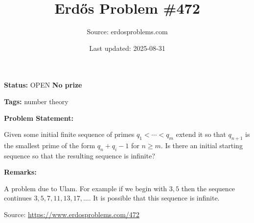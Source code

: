 \documentclass{article}
\title{Erd\H{o}s Problem \#472}
\date{Last updated: 2025-08-31}
\author{Source: erdosproblems.com}
\begin{document}
\maketitle

\noindent\textbf{Status:} OPEN \quad \textbf{No prize}

\noindent\textbf{Tags:} number theory

\medskip
\noindent\textbf{Problem Statement:}

Given some initial finite sequence of primes $q_1<\cdots<q_m$ extend it so that $q_{n+1}$ is the smallest prime of the form $q_n+q_i-1$ for $n\geq m$. Is there an initial starting sequence so that the resulting sequence is infinite?

\bigskip
\noindent\textbf{Remarks:}

A problem due to Ulam. For example if we begin with $3,5$ then the sequence continues $3,5,7,11,13,17,\ldots$. It is possible that this sequence is infinite.

\bigskip
\noindent\small{Source: \url{https://www.erdosproblems.com/472}}
\end{document}
